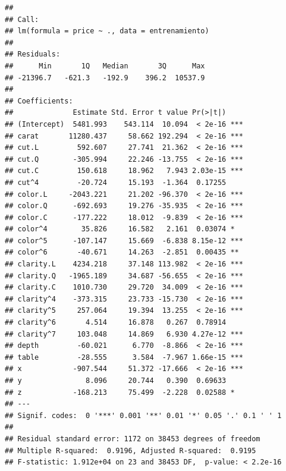\documentclass[
]{article}
\newenvironment{Shaded}{\begin{snugshade}}{\end{snugshade}}
\newcommand{\DataTypeTok}[1]{\textcolor[rgb]{0.13,0.29,0.53}{#1}}
\newcommand{\KeywordTok}[1]{\textcolor[rgb]{0.13,0.29,0.53}{\textbf{#1}}}
\newcommand{\NormalTok}[1]{#1}
\newcommand{\OperatorTok}[1]{\textcolor[rgb]{0.81,0.36,0.00}{\textbf{#1}}}
\newcommand{\StringTok}[1]{\textcolor[rgb]{0.31,0.60,0.02}{#1}}
\begin{document}
\begin{verbatim}
## 
## Call:
## lm(formula = price ~ ., data = entrenamiento)
## 
## Residuals:
##      Min       1Q   Median       3Q      Max 
## -21396.7   -621.3   -192.9    396.2  10537.9 
## 
## Coefficients:
##              Estimate Std. Error t value Pr(>|t|)    
## (Intercept)  5481.993    543.114  10.094  < 2e-16 ***
## carat       11280.437     58.662 192.294  < 2e-16 ***
## cut.L         592.607     27.741  21.362  < 2e-16 ***
## cut.Q        -305.994     22.246 -13.755  < 2e-16 ***
## cut.C         150.618     18.962   7.943 2.03e-15 ***
## cut^4         -20.724     15.193  -1.364  0.17255    
## color.L     -2043.221     21.202 -96.370  < 2e-16 ***
## color.Q      -692.693     19.276 -35.935  < 2e-16 ***
## color.C      -177.222     18.012  -9.839  < 2e-16 ***
## color^4        35.826     16.582   2.161  0.03074 *  
## color^5      -107.147     15.669  -6.838 8.15e-12 ***
## color^6       -40.671     14.263  -2.851  0.00435 ** 
## clarity.L    4234.218     37.148 113.982  < 2e-16 ***
## clarity.Q   -1965.189     34.687 -56.655  < 2e-16 ***
## clarity.C    1010.730     29.720  34.009  < 2e-16 ***
## clarity^4    -373.315     23.733 -15.730  < 2e-16 ***
## clarity^5     257.064     19.394  13.255  < 2e-16 ***
## clarity^6       4.514     16.878   0.267  0.78914    
## clarity^7     103.048     14.869   6.930 4.27e-12 ***
## depth         -60.021      6.770  -8.866  < 2e-16 ***
## table         -28.555      3.584  -7.967 1.66e-15 ***
## x            -907.544     51.372 -17.666  < 2e-16 ***
## y               8.096     20.744   0.390  0.69633    
## z            -168.213     75.499  -2.228  0.02588 *  
## ---
## Signif. codes:  0 '***' 0.001 '**' 0.01 '*' 0.05 '.' 0.1 ' ' 1
## 
## Residual standard error: 1172 on 38453 degrees of freedom
## Multiple R-squared:  0.9196, Adjusted R-squared:  0.9195 
## F-statistic: 1.912e+04 on 23 and 38453 DF,  p-value: < 2.2e-16
\end{verbatim}

\begin{Shaded}
\end{Shaded}
\end{document}
